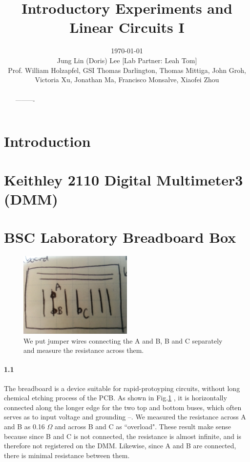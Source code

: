 \documentclass[authoryear, 12pt,5p, times]{elsarticle}
\begin{document}
\begin{frontmatter}
\title{Introductory Experiments and Linear Circuits I}
\author{\today \quad \\Jung Lin (Doris) Lee [Lab Partner: Leah Tom]\\Prof. William Holzapfel, GSI Thomas Darlington, Thomas Mittiga, John Groh,  \\Victoria Xu, Jonathan Ma, Francisco Monsalve, Xiaofei Zhou}
	\begin{abstract}
 ----------
	\end{abstract}
\end{frontmatter}
\section{Introduction} 
 \section{Keithley 2110 Digital Multimeter3 (DMM)}
\section{BSC Laboratory Breadboard Box}
\begin{figure}[h!]
\includegraphics[width=0.5\textwidth]{figure/d_breadboard}
\caption{We put jumper wires connecting the A and B, B and C separately and measure the resistance across them.}
\label{breadboard}
\end{figure}
\paragraph{\textbf{1.1}}
The breadboard is a device suitable for rapid-protoyping circuits, without long chemical etching process of the PCB.  As shown in Fig.\ref{breadboard} , it is horizontally connected along the longer edge for the two top and bottom buses, which often serves as to input voltage and grounding --. We measured the resistance across A and B as 0.16 $\Omega$ and across B and C as ``overload".  These result make sense because since B and C is not connected, the resistance is almost infinite, and is therefore not registered on the DMM. Likewise, since A and B are connected, there is minimal resistance between them.
\end{document}
